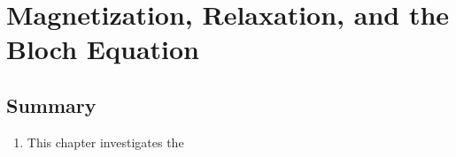 \section{Magnetization, Relaxation, and the Bloch Equation}
\subsection{Summary}
\begin{enumerate}
    \item This chapter investigates the 

\end{enumerate}

